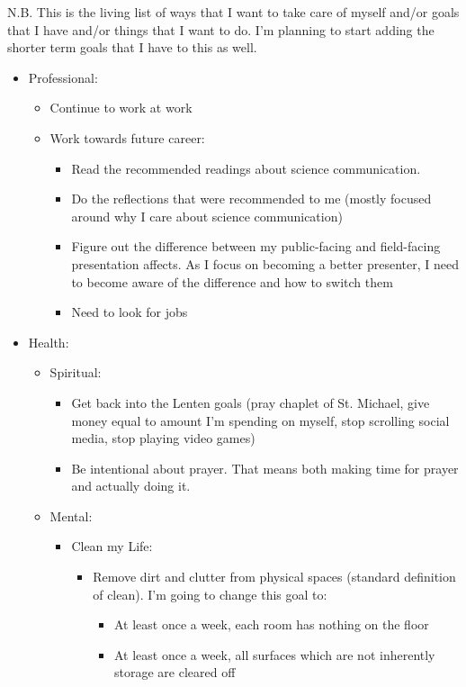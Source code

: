 \documentclass[12pt]{article}[titlepage]
\newcommand{\1}{\={a}}
\newcommand{\2}{\={e}}
\newcommand{\3}{\={\i}}
\newcommand{\4}{\=o}
\newcommand{\5}{\=u}
\newcommand{\6}{\={A}}
\renewcommand{\,}{\textsuperscript{,}}
\begin{document}
N.B. This is the living list of ways that I want to take care of myself and/or goals that I have and/or things that I want to do. I'm planning to start adding the shorter term goals that I have to this as well.

\begin{itemize}   
\item Professional:   
\begin{itemize}   
\item Continue to work at work  
\item Work towards future career:   
\begin{itemize}   
\item Read the recommended readings about science communication.  
\item Do the reflections that were recommended to me (mostly focused around why I care about science communication)   
\item Figure out the difference between my public-facing and field-facing presentation affects. As I focus on becoming a better presenter, I need to become aware of the difference and how to switch them   
\item Need to look for jobs  
\end{itemize}   
\end{itemize}   
\item Health:  
\begin{itemize}   
\item Spiritual:   
\begin{itemize}   
\item Get back into the Lenten goals (pray chaplet of St. Michael, give money equal to amount I'm spending on myself, stop scrolling social media, stop playing video games)  
\item Be intentional about prayer. That means both making time for prayer and actually doing it.  
\end{itemize}   
\item Mental:   
\begin{itemize}   
\item Clean my Life:   
\begin{itemize}   
\item Remove dirt and clutter from physical spaces (standard definition of clean). I'm going to change this goal to:  
\begin{itemize}  
\item At least once a week, each room has nothing on the floor  
\item At least once a week, all surfaces which are not inherently storage are cleared off  

\end{itemize}
\end{itemize}
\end{itemize}
\end{itemize}
\end{itemize}
\end{document}
